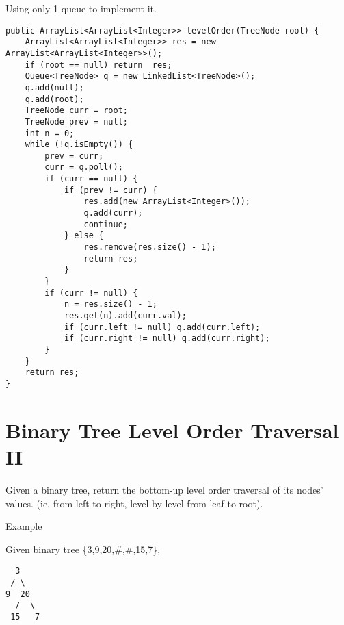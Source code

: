 \documentclass[12pt]{book}
\begin{document}
Using only 1 queue to implement it.
\lstset{language=java,label= ,caption= ,numbers=none}
\begin{lstlisting}
public ArrayList<ArrayList<Integer>> levelOrder(TreeNode root) {
    ArrayList<ArrayList<Integer>> res = new ArrayList<ArrayList<Integer>>();
    if (root == null) return  res;
    Queue<TreeNode> q = new LinkedList<TreeNode>();
    q.add(null);
    q.add(root);
    TreeNode curr = root;
    TreeNode prev = null;
    int n = 0;
    while (!q.isEmpty()) {
        prev = curr;
        curr = q.poll();
        if (curr == null) {
            if (prev != curr) {
                res.add(new ArrayList<Integer>());
                q.add(curr);
                continue;
            } else {
                res.remove(res.size() - 1);
                return res;   
            }
        }
        if (curr != null) {
            n = res.size() - 1;
            res.get(n).add(curr.val);
            if (curr.left != null) q.add(curr.left);
            if (curr.right != null) q.add(curr.right);
        }
    }
    return res;
}
\end{lstlisting}
\chapter{Binary Tree Level Order Traversal II}
\label{sec-16}

Given a binary tree, return the bottom-up level order traversal of its nodes' values. (ie, from left to right, level by level from leaf to root).

Example

Given binary tree \{3,9,20,\#,\#,15,7\},
\lstset{language=java,label= ,caption= ,numbers=none}
\begin{lstlisting}
  3
 / \
9  20
  /  \
 15   7
\end{lstlisting}
\end{document}

